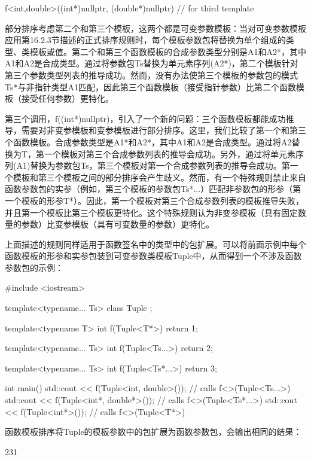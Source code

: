 \begin{cpp}
f<int,double>((int*)nullptr, (double*)nullptr) // for third template
\end{cpp}

部分排序考虑第二个和第三个模板，这两个都是可变参数模板：当对可变参数模板应用第16.2.3节描述的正式排序规则时，每个模板参数包将替换为单个组成的类型、类模板或值。第二个和第三个函数模板的合成参数类型分别是A1和A2*，其中A1和A2是合成类型。通过将参数包Ts替换为单元素序列(A2*)，第二个模板针对第三个参数类型列表的推导成功。然而，没有办法使第三个模板的参数包的模式Ts*与非指针类型A1匹配，因此第三个函数模板（接受指针参数）比第二个函数模板（接受任何参数）更特化。

第三个调用，f((int*)nullptr)，引入了一个新的问题：三个函数模板都能成功推导，需要对非变参模板和变参模板进行部分排序。这里，我们比较了第一个和第三个函数模板。合成参数类型是A1*和A2*，其中A1和A2是合成类型。通过将A2替换为T，第一个模板对第三个合成参数列表的推导会成功。另外，通过将单元素序列(A1)替换为参数包Ts，第三个模板对第一个合成参数列表的推导会成功。第一个模板和第三个模板之间的部分排序会产生歧义。然而，有一个特殊规则禁止来自函数参数包的实参（例如，第三个模板的参数包Ts*...）匹配非参数包的形参（第一个模板的形参T*）。因此，第一个模板对第三个合成参数列表的模板推导失败，并且第一个模板比第三个模板更特化。这个特殊规则认为非变参模板（具有固定数量的参数）比变参模板（具有可变数量的参数）更特化。

上面描述的规则同样适用于函数签名中的类型中的包扩展。可以将前面示例中每个函数模板的形参和实参包装到可变参数类模板Tuple中，从而得到一个不涉及函数参数包的示例：

\begin{cpp}
#include <iostream>

template<typename... Ts> class Tuple
{
};

template<typename T>
int f(Tuple<T*>)
{
	return 1;
}

template<typename... Ts>
int f(Tuple<Ts...>)
{
	return 2;
}

template<typename... Ts>
int f(Tuple<Ts*...>)
{
	return 3;
}

int main()
{
	std::cout << f(Tuple<int, double>()); // calls f<>(Tuple<Ts...>)
	std::cout << f(Tuple<int*, double*>()); // calls f<>(Tuple<Ts*...>)
	std::cout << f(Tuple<int*>()); // calls f<>(Tuple<T*>)
}
\end{cpp}

函数模板排序将Tuple的模板参数中的包扩展为函数参数包，会输出相同的结果：

\begin{shell}
231
\end{shell}





















